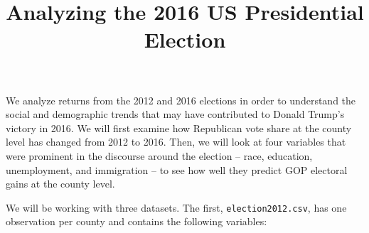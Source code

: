 \documentclass[]{article}
\title{Analyzing the 2016 US Presidential Election}
\author{}
\date{}
\begin{document}
\maketitle


We analyze returns from the 2012 and 2016 elections in order to
understand the social and demographic trends that may have contributed
to Donald Trump's victory in 2016. We will first examine how Republican
vote share at the county level has changed from 2012 to 2016. Then, we
will look at four variables that were prominent in the discourse around
the election -- race, education, unemployment, and immigration -- to see
how well they predict GOP electoral gains at the county level.

We will be working with three datasets. The first,
\texttt{election2012.csv}, has one observation per county and contains
the following variables:
\end{document}
